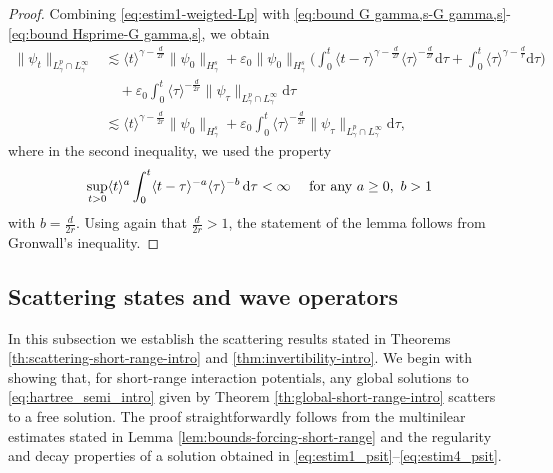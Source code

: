 \documentclass[12pt]{article}
\theoremstyle{plain}
\begin{document}
\begin{proof}
Combining \eqref{eq:estim1-weigted-Lp} with \eqref{eq:bound G gamma,s-G gamma,s}-\eqref{eq:bound Hsprime-G gamma,s}, we obtain
\begin{align*}
    \big\|\psi_t\big\|_{L^{p}_\gamma\cap L^\infty_\gamma} &\lesssim  \langle t\rangle^{\gamma-\frac{d}{2r}}  \|\psi_0\|_{H^s_\gamma}+ \varepsilon_0 \|\psi_0\|_{H^s_\gamma}\Big( \int_0^t\langle t-\tau\rangle^{\gamma-\frac{d}{2r}}\langle\tau\rangle^{-\frac {d}{2r}} \mathrm{d}\tau+\int_0^t\langle\tau\rangle^{\gamma-\frac{d}{r}}\mathrm{d}\tau\Big)\\
    &\quad+\varepsilon_0 \int_0^t\langle\tau\rangle^{-\frac{ d}{2r}}\|\psi_\tau\|_{L^p_\gamma\cap L^\infty_\gamma}\mathrm{d}\tau\\
    &\lesssim  \langle t\rangle^{\gamma-\frac{d}{2r}}  \|\psi_0\|_{H^s_\gamma}+\varepsilon_0 \int_0^t\langle\tau\rangle^{-\frac{d}{2r}}\|\psi_\tau\|_{L^p_\gamma\cap L^\infty_\gamma}\mathrm{d}\tau,
\end{align*}
where in the second inequality, we used the property 
\begin{equation*}
    \sup_{t>0} \langle t \rangle^a \int_0^t \langle t-\tau\rangle^{-a} \langle\tau \rangle^{-b}\, \mathrm{d}\tau<\infty \  \quad \textnormal{for any }a\geq0,\ b>1
\end{equation*}
with $b=\frac d{2r}$.
Using again that $\frac{d}{2r}>1$, the statement of the lemma follows from Gronwall's inequality.
\end{proof}

\subsection{Scattering states and wave operators}
\label{sect: wave op}


In this subsection we establish the scattering results stated in Theorems \ref{th:scattering-short-range-intro} and \ref{thm:invertibility-intro}. 
We begin with showing that, for short-range interaction potentials, any global solutions to \eqref{eq:hartree_semi_intro} given by Theorem \ref{th:global-short-range-intro} scatters to a free solution. The proof straightforwardly follows from the multinilear estimates stated in Lemma \ref{lem:bounds-forcing-short-range} and the regularity and decay properties of a solution obtained in \eqref{eq:estim1_psit}--\eqref{eq:estim4_psit}.
		
			
\end{document}
